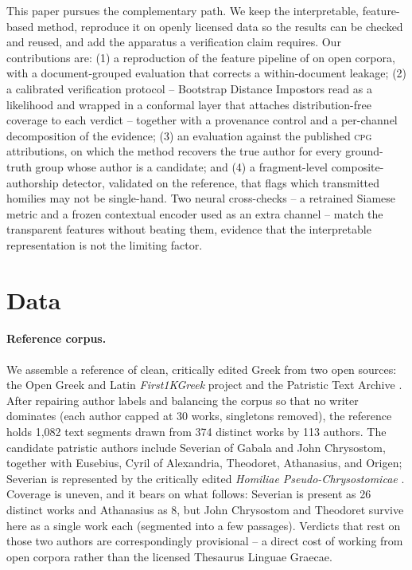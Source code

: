 \documentclass{anthology-ch}
\begin{document}
This paper pursues the complementary path. We keep the interpretable, feature-based method, reproduce it on openly licensed data so the results can be checked and reused, and add the apparatus a verification claim requires. Our contributions are: (1) a reproduction of the feature pipeline of \textcite{clerice2023} on open corpora, with a document-grouped evaluation that corrects a within-document leakage; (2) a calibrated verification protocol -- Bootstrap Distance Impostors \cite{nagy2024} read as a likelihood and wrapped in a conformal layer \cite{vovk2005,angelopoulos2023} that attaches distribution-free coverage to each verdict -- together with a provenance control and a per-channel decomposition of the evidence; (3) an evaluation against the published \textsc{cpg} attributions, on which the method recovers the true author for every ground-truth group whose author is a candidate; and (4) a fragment-level composite-authorship detector, validated on the reference, that flags which transmitted homilies may not be single-hand. Two neural cross-checks -- a retrained Siamese metric and a frozen contextual encoder used as an extra channel -- match the transparent features without beating them, evidence that the interpretable representation is not the limiting factor.

\section{Data}

\paragraph{Reference corpus.} We assemble a reference of clean, critically edited Greek from two open sources: the Open Greek and Latin \emph{First1KGreek} project \cite{first1k} and the Patristic Text Archive \cite{pta}. After repairing author labels and balancing the corpus so that no writer dominates (each author capped at 30 works, singletons removed), the reference holds 1{,}082 text segments drawn from 374 distinct works by 113 authors. The candidate patristic authors include Severian of Gabala and John Chrysostom, together with Eusebius, Cyril of Alexandria, Theodoret, Athanasius, and Origen; Severian is represented by the critically edited \emph{Homiliae Pseudo-Chrysostomicae} \cite{hpc}. Coverage is uneven, and it bears on what follows: Severian is present as 26 distinct works and Athanasius as 8, but John Chrysostom and Theodoret survive here as a single work each (segmented into a few passages). Verdicts that rest on those two authors are correspondingly provisional -- a direct cost of working from open corpora rather than the licensed Thesaurus Linguae Graecae.
\end{document}
